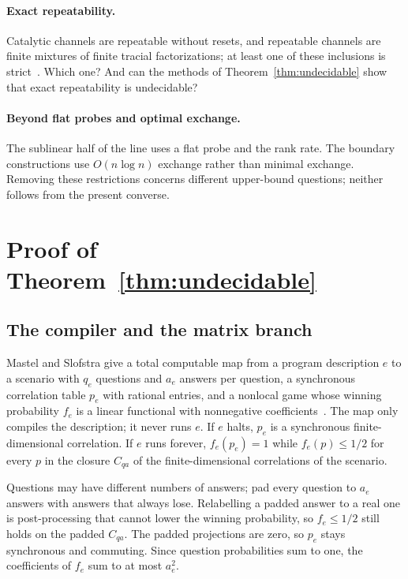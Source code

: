 \documentclass[11pt]{article}
\theoremstyle{definition}
\theoremstyle{remark}
\begin{document}
\paragraph{Exact repeatability.}
Catalytic channels are repeatable without resets, and repeatable channels are finite mixtures of finite tracial factorizations; at least one of these inclusions is strict~\cite[Proposition~4.6 and Section~9]{Law}. Which one? And can the methods of Theorem~\ref{thm:undecidable} show that exact repeatability is undecidable?

\paragraph{Beyond flat probes and optimal exchange.}
The sublinear half of the line uses a flat probe and the rank rate. The boundary constructions use $O(n\log n)$ exchange rather than minimal exchange. Removing these restrictions concerns different upper-bound questions; neither follows from the present converse.


\appendix

\section{Proof of Theorem~\ref{thm:undecidable}}\label{app:undecidable}

\subsection{The compiler and the matrix branch}

Mastel and Slofstra give a total computable map from a program description $e$ to a scenario with $q_e$ questions and $a_e$ answers per question, a synchronous correlation table $p_e$ with rational entries, and a nonlocal game whose winning probability $f_e$ is a linear functional with nonnegative coefficients~\cite[Corollary~9.16 and its proof; rationality from the sampler of Remark~9.13]{MastelSlofstra}. The map only compiles the description; it never runs $e$. If $e$ halts, $p_e$ is a synchronous finite-dimensional correlation. If $e$ runs forever, $f_e(p_e)=1$ while $f_e(p)\le1/2$ for every $p$ in the closure $C_{qa}$ of the finite-dimensional correlations of the scenario.

Questions may have different numbers of answers; pad every question to $a_e$ answers with answers that always lose. Relabelling a padded answer to a real one is post-processing that cannot lower the winning probability, so $f_e\le1/2$ still holds on the padded $C_{qa}$. The padded projections are zero, so $p_e$ stays synchronous and commuting. Since question probabilities sum to one, the coefficients of $f_e$ sum to at most $a_e^2$.
\end{document}
